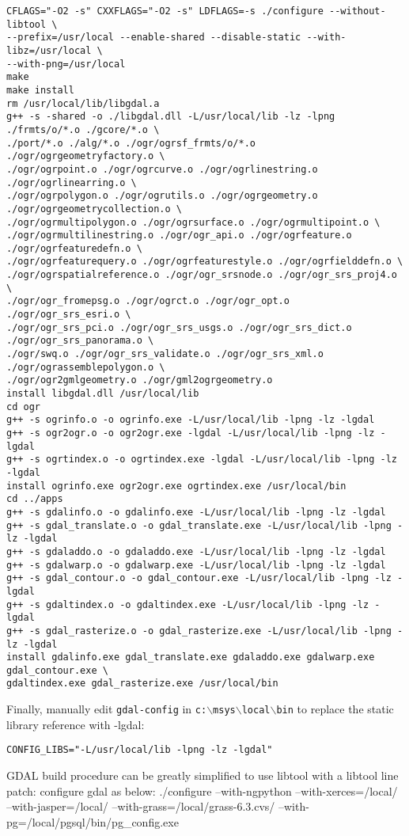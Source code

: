 \begin{verbatim}
CFLAGS="-O2 -s" CXXFLAGS="-O2 -s" LDFLAGS=-s ./configure --without-libtool \
--prefix=/usr/local --enable-shared --disable-static --with-libz=/usr/local \
--with-png=/usr/local
make
make install
rm /usr/local/lib/libgdal.a
g++ -s -shared -o ./libgdal.dll -L/usr/local/lib -lz -lpng ./frmts/o/*.o ./gcore/*.o \
./port/*.o ./alg/*.o ./ogr/ogrsf_frmts/o/*.o ./ogr/ogrgeometryfactory.o \
./ogr/ogrpoint.o ./ogr/ogrcurve.o ./ogr/ogrlinestring.o ./ogr/ogrlinearring.o \
./ogr/ogrpolygon.o ./ogr/ogrutils.o ./ogr/ogrgeometry.o ./ogr/ogrgeometrycollection.o \
./ogr/ogrmultipolygon.o ./ogr/ogrsurface.o ./ogr/ogrmultipoint.o \
./ogr/ogrmultilinestring.o ./ogr/ogr_api.o ./ogr/ogrfeature.o ./ogr/ogrfeaturedefn.o \ 
./ogr/ogrfeaturequery.o ./ogr/ogrfeaturestyle.o ./ogr/ogrfielddefn.o \
./ogr/ogrspatialreference.o ./ogr/ogr_srsnode.o ./ogr/ogr_srs_proj4.o \
./ogr/ogr_fromepsg.o ./ogr/ogrct.o ./ogr/ogr_opt.o ./ogr/ogr_srs_esri.o \
./ogr/ogr_srs_pci.o ./ogr/ogr_srs_usgs.o ./ogr/ogr_srs_dict.o ./ogr/ogr_srs_panorama.o \
./ogr/swq.o ./ogr/ogr_srs_validate.o ./ogr/ogr_srs_xml.o ./ogr/ograssemblepolygon.o \
./ogr/ogr2gmlgeometry.o ./ogr/gml2ogrgeometry.o
install libgdal.dll /usr/local/lib
cd ogr
g++ -s ogrinfo.o -o ogrinfo.exe -L/usr/local/lib -lpng -lz -lgdal
g++ -s ogr2ogr.o -o ogr2ogr.exe -lgdal -L/usr/local/lib -lpng -lz -lgdal
g++ -s ogrtindex.o -o ogrtindex.exe -lgdal -L/usr/local/lib -lpng -lz -lgdal
install ogrinfo.exe ogr2ogr.exe ogrtindex.exe /usr/local/bin
cd ../apps
g++ -s gdalinfo.o -o gdalinfo.exe -L/usr/local/lib -lpng -lz -lgdal
g++ -s gdal_translate.o -o gdal_translate.exe -L/usr/local/lib -lpng -lz -lgdal
g++ -s gdaladdo.o -o gdaladdo.exe -L/usr/local/lib -lpng -lz -lgdal
g++ -s gdalwarp.o -o gdalwarp.exe -L/usr/local/lib -lpng -lz -lgdal
g++ -s gdal_contour.o -o gdal_contour.exe -L/usr/local/lib -lpng -lz -lgdal
g++ -s gdaltindex.o -o gdaltindex.exe -L/usr/local/lib -lpng -lz -lgdal
g++ -s gdal_rasterize.o -o gdal_rasterize.exe -L/usr/local/lib -lpng -lz -lgdal
install gdalinfo.exe gdal_translate.exe gdaladdo.exe gdalwarp.exe gdal_contour.exe \
gdaltindex.exe gdal_rasterize.exe /usr/local/bin

\end{verbatim}

Finally, manually edit \texttt{gdal-config} in \texttt{c:$\backslash$msys$\backslash$local$\backslash$bin} to replace the static library reference with -lgdal:

\begin{verbatim}
CONFIG_LIBS="-L/usr/local/lib -lpng -lz -lgdal"
\end{verbatim}
GDAL build procedure can be greatly simplified to use libtool with a libtool line patch:
configure gdal as below:
./configure --with-ngpython --with-xerces=/local/ --with-jasper=/local/ --with-grass=/local/grass-6.3.cvs/ --with-pg=/local/pgsql/bin/pg\_config.exe 


